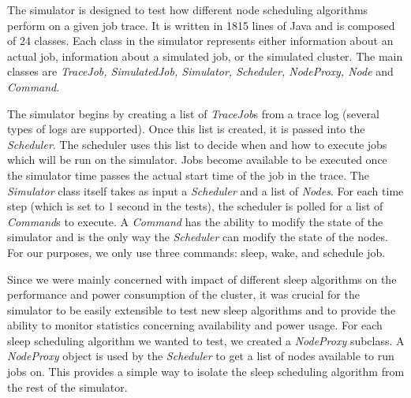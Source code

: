 The simulator is designed to test how different node scheduling algorithms perform on a given job trace. It is written in 1815 lines of Java and is composed of 24 classes. Each class in the simulator represents either information about an actual job, information about a simulated job, or the simulated cluster. The main classes are {\em TraceJob, SimulatedJob, Simulator, Scheduler, NodeProxy, Node} and {\em Command}. 

The simulator begins by creating a list of \emph{TraceJob}s from a trace log (several types of logs are supported). Once this list is created, it is passed into the \emph{Scheduler}. The scheduler uses this list to decide when and how to execute jobs which will be run on the simulator. Jobs become available to be executed once the simulator time passes the actual start time of the job in the trace. The \emph{Simulator} class itself takes as input a \emph{Scheduler} and a list of \emph{Nodes}. For each time step (which is set to 1 second in the tests), the scheduler is polled for a list of \emph{Command}s to execute. A \emph{Command} has the ability to modify the state of the simulator and is the only way the \emph{Scheduler} can modify the state of the nodes. For our purposes, we only use three commands: sleep, wake, and schedule job. %

Since we were mainly concerned with impact of different sleep algorithms on the performance and power consumption of the cluster, it was crucial for the simulator to be easily extensible to test new sleep algorithms and to provide the ability to monitor statistics concerning availability and power usage. For each sleep scheduling algorithm we wanted to test, we created a \emph{NodeProxy} subclass. A \emph{NodeProxy} object is used by the \emph{Scheduler} to get a list of nodes available to run jobs on. This provides a simple way to isolate the sleep scheduling algorithm from the rest of the simulator. %


